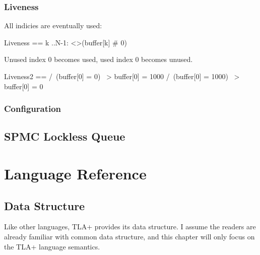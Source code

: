 \documentclass{report}
\begin{document}
\section{Liveness}

All indicies are eventually used:

\begin{tla}
    Liveness ==
    \A k ..N-1:
    <>(buffer[k] # 0)
\end{tla}
\begin{tlatex}
%
%
%
\end{tlatex}

Unused index 0 becomes used, used index 0 becomes unused.
\begin{tla}
    Liveness2 ==
    /\ (buffer[0] = 0) ~> buffer[0] = 1000
    /\ (buffer[0] = 1000) ~> buffer[0] = 0
\end{tla}
\begin{tlatex}
%
\end{tlatex}

\section{Configuration}

\chapter{SPMC Lockless Queue}

\part{Language Reference}

\chapter{Data Structure}




Like other languages, TLA+ provides its data structure. I assume the readers are
already familiar with common data structure, and this chapter will only focus on
the TLA+ language semantics. 
\end{document}
